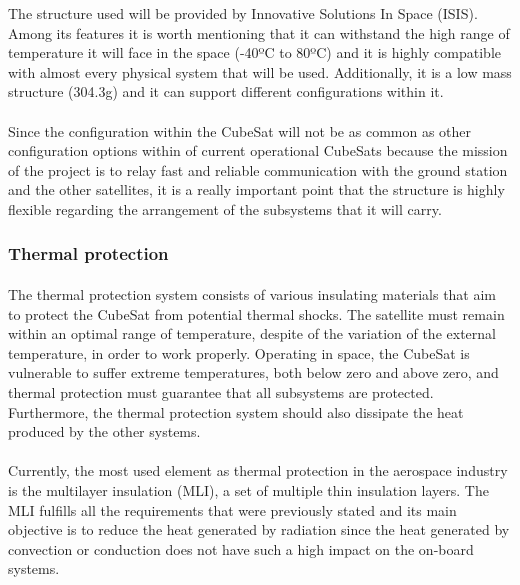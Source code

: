 The structure used will be provided by Innovative Solutions In Space (ISIS). Among its features it is worth mentioning that it can withstand the high range of temperature it will face in the space (-40ºC to 80ºC) and it is highly compatible with almost every physical system that will be used. Additionally, it is a low mass structure (304.3g) and it can support different configurations within it.

\paragraph{}Since the configuration within the CubeSat will not be as common as other configuration options within of current operational CubeSats because the mission of the project is to relay fast and reliable communication with the ground station and the other satellites, it is a really important point that the structure is highly flexible regarding the arrangement of the subsystems that it will carry.

\subsubsection{Thermal protection}
\paragraph{}The thermal protection system consists of various insulating materials that aim to protect the CubeSat from potential thermal shocks. The satellite must remain within an optimal range of temperature, despite of the variation of the external temperature, in order to work properly. Operating in space, the CubeSat is vulnerable to suffer extreme temperatures, both below zero and above zero, and thermal protection must guarantee that all subsystems are protected. Furthermore, the thermal protection system should also dissipate the heat produced by the other systems.

\paragraph{} Currently, the most used element as thermal protection in the aerospace industry is the multilayer insulation (MLI), a set of multiple thin insulation layers. The MLI fulfills all the requirements that were previously stated and its main objective is to reduce the heat generated by radiation since the heat generated by convection or conduction does not have such a high impact on the on-board systems.


